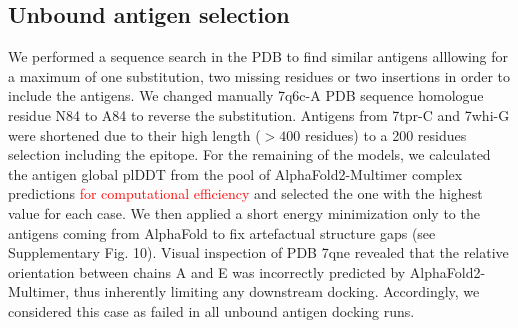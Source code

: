 \documentclass[12pt]{article}
\begin{document}
\subsection{Unbound antigen selection}
We performed a sequence search in the PDB to find similar antigens alllowing for a maximum of one substitution, two missing residues or two insertions in order to include the antigens. We changed manually 7q6c-A PDB sequence homologue residue N84 to A84 to reverse the substitution. Antigens from 7tpr-C and 7whi-G were shortened due to their high length ($>400$ residues) to a 200 residues selection including the epitope. For the remaining of the models, we calculated the antigen global plDDT from the pool of AlphaFold2-Multimer complex predictions \textcolor{Red}{for computational efficiency} and selected the one with the highest value for each case. We then applied a short energy minimization only to the antigens coming from AlphaFold to fix artefactual structure gaps (see Supplementary Fig. 10). Visual inspection of PDB 7qne revealed that the relative orientation between chains A and E was incorrectly predicted by AlphaFold2-Multimer, thus inherently limiting any downstream docking. Accordingly, we considered this case as failed in all unbound antigen docking runs. %
\end{document}
